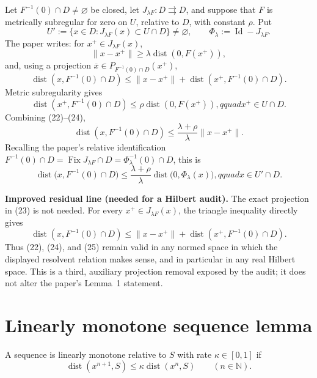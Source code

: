 \documentclass[11pt]{article}
\newenvironment{improved}{\par\begingroup\color{red}}{\par\endgroup}
\newcommand{\dist}{\operatorname{dist}}
\newcommand{\Fix}{\operatorname{Fix}}
\newcommand{\Id}{\operatorname{Id}}
\newcommand{\barx}{\overline{x}}
\begin{document}
Let \(F^{-1}(0)\cap D\ne\varnothing\) be closed, let \(J_{\lambda F}:D\rightrightarrows D\), and suppose that \(F\) is metrically subregular for zero on \(U\), relative to \(D\), with constant \(\rho\). Put
\[
U':=\{x\in D:J_{\lambda F}(x)\subset U\cap D\}\ne\varnothing,
\qquad \Phi_\lambda:=\Id-J_{\lambda F}.
\]
The paper writes: for \(x^+\in J_{\lambda F}(x)\),
\begin{equation}
 \|x-x^+\|\ge\lambda\dist(0,F(x^+)),                         \tag{22}
\end{equation}
and, using a projection \(\barx\in P_{F^{-1}(0)\cap D}(x^+)\),
\begin{equation}
 \dist(x,F^{-1}(0)\cap D)
 \le\|x-x^+\|+\dist(x^+,F^{-1}(0)\cap D).                    \tag{23}
\end{equation}
Metric subregularity gives
\begin{equation}
 \dist(x^+,F^{-1}(0)\cap D)\le\rho\dist(0,F(x^+)),qquad x^+\in U\cap D. \tag{24}
\end{equation}
Combining (22)--(24),
\begin{equation}
 \dist(x,F^{-1}(0)\cap D)\le\frac{\lambda+\rho}{\lambda}\|x-x^+\|. \tag{25}
\end{equation}
Recalling the paper's relative identification
\(F^{-1}(0)\cap D=\Fix J_{\lambda F}\cap D=\Phi_\lambda^{-1}(0)\cap D\), this is
\begin{equation}
 \dist\bigl(x,F^{-1}(0)\cap D\bigr)
 \le\frac{\lambda+\rho}{\lambda}\dist\bigl(0,\Phi_\lambda(x)\bigr),qquad x\in U'\cap D. \tag{L1}
\end{equation}

\begin{improved}
\textbf{Improved residual line (needed for a Hilbert audit).} The exact projection in (23) is not needed. For every \(x^+\in J_{\lambda F}(x)\), the triangle inequality directly gives
\[
\dist(x,F^{-1}(0)\cap D)
\le \|x-x^+\|+\dist(x^+,F^{-1}(0)\cap D).
\]
Thus (22), (24), and (25) remain valid in any normed space in which the displayed resolvent relation makes sense, and in particular in any real Hilbert space. This is a third, auxiliary projection removal exposed by the audit; it does not alter the paper's Lemma~1 statement.
\end{improved}

\section{Linearly monotone sequence lemma}

A sequence is linearly monotone relative to \(S\) with rate \(\kappa\in[0,1]\) if
\begin{equation}
 \dist(x^{n+1},S)\le\kappa\dist(x^n,S)\qquad(n\in\mathbb N).       \tag{26}
\end{equation}
\end{document}
